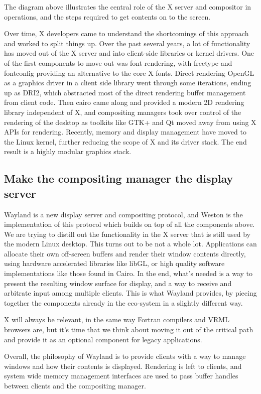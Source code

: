 \documentclass{article}
\begin{document}
The diagram above illustrates the central role of the X server and
compositor in operations, and the steps required to get contents on to
the screen.

Over time, X developers came to understand the shortcomings of this
approach and worked to split things up.  Over the past several years,
a lot of functionality has moved out of the X server and into
client-side libraries or kernel drivers. One of the first components
to move out was font rendering, with freetype and fontconfig providing
an alternative to the core X fonts.  Direct rendering OpenGL as a
graphics driver in a client side library went through some iterations,
ending up as DRI2, which abstracted most of the direct rendering
buffer management from client code. Then cairo came along and provided
a modern 2D rendering library independent of X, and compositing
managers took over control of the rendering of the desktop as toolkits
like GTK+ and Qt moved away from using X APIs for rendering. Recently,
memory and display management have moved to the Linux kernel, further
reducing the scope of X and its driver stack.  The end result is a
highly modular graphics stack.

\subsection{Make the compositing manager the display server}

Wayland is a new display server and compositing protocol, and Weston
is the implementation of this protocol which builds on top of all the
components above. We are trying to distill out the functionality in
the X server that is still used by the modern Linux desktop. This
turns out to be not a whole lot. Applications can allocate their own
off-screen buffers and render their window contents directly, using
hardware accelerated libraries like libGL, or high quality software
implementations like those found in Cairo. In the end, what’s needed
is a way to present the resulting window surface for display, and a
way to receive and arbitrate input among multiple clients. This is
what Wayland provides, by piecing together the components already in
the eco-system in a slightly different way.

X will always be relevant, in the same way Fortran compilers and VRML
browsers are, but it’s time that we think about moving it out of the
critical path and provide it as an optional component for legacy
applications.

Overall, the philosophy of Wayland is to provide clients with a way to
manage windows and how their contents is displayed.  Rendering is left
to clients, and system wide memory management interfaces are used to
pass buffer handles between clients and the compositing manager.
\end{document}
